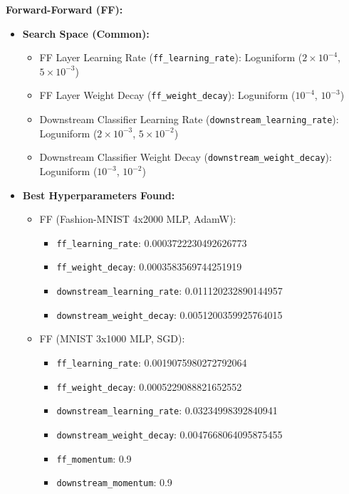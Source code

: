 \documentclass[11pt, english]{article}
\begin{document}
\textbf{Forward-Forward (FF):}
\begin{itemize}
    \item \textbf{Search Space (Common):}
        \begin{itemize}
            \item FF Layer Learning Rate (\texttt{ff\_learning\_rate}): Loguniform ($2 \times 10^{-4}$, $5 \times 10^{-3}$)
            \item FF Layer Weight Decay (\texttt{ff\_weight\_decay}): Loguniform ($10^{-4}$, $10^{-3}$)
            \item Downstream Classifier Learning Rate (\texttt{downstream\_learning\_rate}): Loguniform ($2 \times 10^{-3}$, $5 \times 10^{-2}$)
            \item Downstream Classifier Weight Decay (\texttt{downstream\_weight\_decay}): Loguniform ($10^{-3}$, $10^{-2}$)
        \end{itemize}
    \item \textbf{Best Hyperparameters Found:}
        \begin{itemize}
            \item FF (Fashion-MNIST 4x2000 MLP, AdamW):
                \begin{itemize}
                    \item \texttt{ff\_learning\_rate}: 0.0003722230492626773
                    \item \texttt{ff\_weight\_decay}: 0.0003583569744251919
                    \item \texttt{downstream\_learning\_rate}: 0.011120232890144957
                    \item \texttt{downstream\_weight\_decay}: 0.0051200359925764015
                \end{itemize}
             \item FF (MNIST 3x1000 MLP, SGD):
                 \begin{itemize}
                     \item \texttt{ff\_learning\_rate}: 0.0019075980272792064
                     \item \texttt{ff\_weight\_decay}: 0.0005229088821652552
                     \item \texttt{downstream\_learning\_rate}: 0.03234998392840941
                     \item \texttt{downstream\_weight\_decay}: 0.0047668064095875455
                     \item \texttt{ff\_momentum}: 0.9
                     \item \texttt{downstream\_momentum}: 0.9

\end{itemize}
\end{itemize}
\end{itemize}
\end{document}

